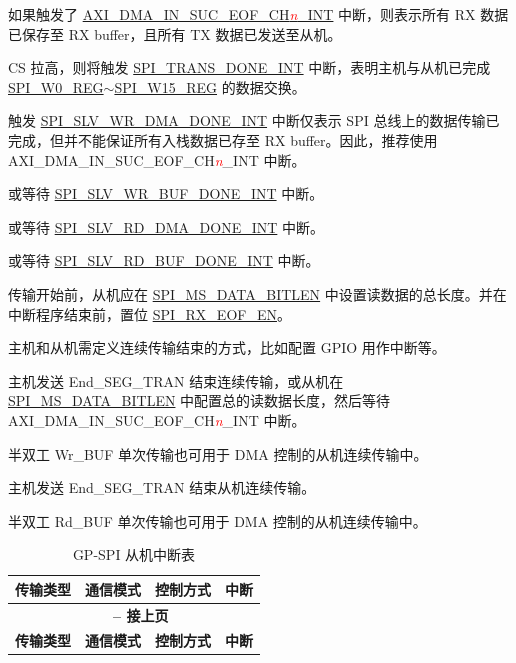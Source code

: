 \documentclass[main\_\_CN.tex]{subfiles}
\begin{document}
\begin{ThreePartTable}

\begin{TableNotes}
    \item[1] 如果触发了 \hyperref[int:GDMAINSUCEOFINT]{AXI\_DMA\_IN\_SUC\_EOF\_CH\textcolor{red}{\it{n}}\_INT}  中断，则表示所有 RX 数据已保存至 RX buffer，且所有 TX 数据已发送至从机。
    \item[2] CS 拉高，则将触发 \hyperref[int:SPITRANSDONEINT]{SPI\_TRANS\_DONE\_INT} 中断，表明主机与从机已完成 \hyperref[regdesc:SPIW0REG]{SPI\_W0\_REG}$\sim$\hyperref[regdesc:SPIW15REG]{SPI\_W15\_REG} 的数据交换。
    \item[3] 触发 \hyperref[int:SPISLVWRDMADONEINT]{SPI\_SLV\_WR\_DMA\_DONE\_INT} 中断仅表示 SPI 总线上的数据传输已完成，但并不能保证所有入栈数据已存至 RX buffer。因此，推荐使用 AXI\_DMA\_IN\_SUC\_EOF\_CH\textcolor{red}{\it{n}}\_INT 中断。
    \item[4] 或等待 \hyperref[int:SPISLVWRBUFDONEINT]{SPI\_SLV\_WR\_BUF\_DONE\_INT} 中断。
    \item[5] 或等待 \hyperref[int:SPISLVRDDMADONEINT]{SPI\_SLV\_RD\_DMA\_DONE\_INT} 中断。
    \item[6] 或等待 \hyperref[int:SPISLVRDBUFDONEINT]{SPI\_SLV\_RD\_BUF\_DONE\_INT} 中断。
    \item[7] 传输开始前，从机应在 \hyperref[fielddesc:SPIMSDATABITLEN]{SPI\_MS\_DATA\_BITLEN} 中设置读数据的总长度。并在中断程序结束前，置位 \hyperref[fielddesc:SPIRXEOFEN]{SPI\_RX\_EOF\_EN}。
    \item[8] 主机和从机需定义连续传输结束的方式，比如配置 GPIO 用作中断等。
    \item[9] 主机发送 End\_SEG\_TRAN 结束连续传输，或从机在 \hyperref[fielddesc:SPIMSDATABITLEN]{SPI\_MS\_DATA\_BITLEN} 中配置总的读数据长度，然后等待 AXI\_DMA\_IN\_SUC\_EOF\_CH\textcolor{red}{\it{n}}\_INT 中断。
    \item[10] 半双工 Wr\_BUF 单次传输也可用于 DMA 控制的从机连续传输中。
    \item[11] 主机发送 End\_SEG\_TRAN 结束从机连续传输。
    \item[12] 半双工 Rd\_BUF 单次传输也可用于 DMA 控制的从机连续传输中。
\end{TableNotes}

\begin{longtable}[c]{|l|l|l|l|}
\caption{GP-SPI 从机中断表}
\label{Table:Slv_Int_Table}
\\\hline

\rowcolor{lightgray}
\textbf{传输类型 } & \textbf{ 通信模式} & \textbf{ 控制方式} & \textbf{ 中断 } \\\hline
    \endfirsthead
    \multicolumn{4}{c}{\bfseries \tablename\ \thetable{} -- 接上页}\\\hline
    \rowcolor{lightgray}
    \textbf{传输类型 } & \textbf{ 通信模式} & \textbf{ 控制方式} & \textbf{ 中断 }\\\hline
    \endhead
    

\end{longtable}
\end{ThreePartTable}
\end{document}
